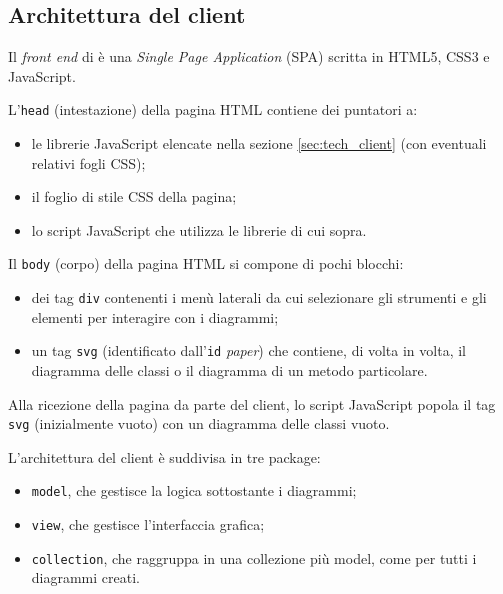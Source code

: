 \subsection{Architettura del client} \label{sec:arch_client}
Il \emph{front end} di \proj{} è una \emph{Single Page Application} (SPA) scritta in HTML5, CSS3 e JavaScript.

L'\texttt{head} (intestazione) della pagina HTML contiene dei puntatori a:
\begin{itemize}
	\item le librerie JavaScript elencate nella sezione \ref{sec:tech_client} (con eventuali relativi fogli CSS);
	\item il foglio di stile CSS della pagina;
	\item lo script JavaScript che utilizza le librerie di cui sopra.
\end{itemize}

Il \texttt{body} (corpo) della pagina HTML si compone di pochi blocchi:
\begin{itemize}
	\item dei tag \texttt{div} contenenti i menù laterali da cui selezionare gli strumenti e gli elementi per interagire con i diagrammi;
	\item un tag \texttt{svg} (identificato dall'\texttt{id} \emph{paper}) che contiene, di volta in volta, il diagramma delle classi o il diagramma di un metodo particolare.
\end{itemize}
Alla ricezione della pagina da parte del client, lo script JavaScript popola il tag \texttt{svg} (inizialmente vuoto) con un diagramma delle classi vuoto.

L'architettura del client è suddivisa in tre package:
\begin{itemize}
	\item \texttt{model}, che gestisce la logica sottostante i diagrammi;
	\item \texttt{view}, che gestisce l'interfaccia grafica;
	\item \texttt{collection}, che raggruppa in una collezione più model, come per tutti i diagrammi creati.
\end{itemize}





